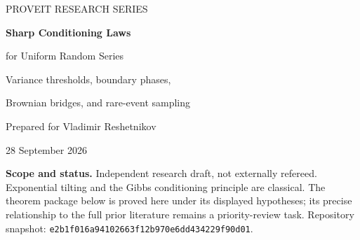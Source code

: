 \documentclass[11pt,a4paper]{article}
\numberwithin{equation}{section}
\theoremstyle{definition}
\theoremstyle{remark}
\begin{document}
\hypersetup{pageanchor=false}
\begin{titlepage}
\vspace*{8mm}
{\large\sffamily\color{ink} PROVEIT RESEARCH SERIES\par}
\vspace{12mm}
{\Huge\bfseries Sharp Conditioning Laws\par
 for Uniform Random Series\par}
\vspace{7mm}
{\Large Variance thresholds, boundary phases,\par
 Brownian bridges, and rare-event sampling\par}
\vspace{10mm}
{\normalsize Prepared for Vladimir Reshetnikov\par
 28 September 2026\par}
\vspace{12mm}
\begin{abstract}
Let $S=\sum_{k\ge1}w_kU_k$, where the $U_k$ are independent uniform
random variables and the positive weights are summable. What does an
entire configuration look like when $S$ is forced close to zero? We prove
a conditional-law theorem for the moving exponential tilt of this series.
For every positive summable weight sequence, a coordinate block is
asymptotically unaffected by the conditioning in total variation if and
only if it carries a vanishing fraction of the tilted variance. No
monotonicity or regular spacing of the weights is required. For a
limiting variance fraction $\alpha\in(0,1)$, we calculate the exact
nonzero total-variation profile and the relative-entropy limit
$[-\log(1-\alpha)-\alpha]/2$. At fraction one, total variation tends to
one and relative entropy diverges.

For geometric weights, including the classical Fabius distribution,
we identify an infinite, phase-dependent boundary product law, prove a
Brownian-bridge limit for conditioned partial sums, and show that the
rescaled gap to the conditioning boundary becomes an independent
exponential random variable. The same variance criterion applies to
stretched-exponential and polynomial weights. A lazy rejection sampler
is exact in a real-arithmetic model and uses asymptotically
$\sqrt{2\pi}\,n^{3/2}$ scalar uniform draws per accepted geometric
configuration, where $n$ is the effective dimension.

The proofs are given in full. Exact finite-simplex formulas and
reproducible numerical experiments check the constants, but are not
used as substitutes for proofs. The contribution is a conditional
configuration theory connected to the repository's scalar Fabius
endpoint program; neither global priority nor Lean verification is
asserted.
\end{abstract}
\vfill
\noindent\small
\textbf{Scope and status.} Independent research draft, not externally
refereed. Exponential tilting and the Gibbs conditioning principle are
classical. The theorem package below is proved here under its displayed
hypotheses; its precise relationship to the full prior literature remains
a priority-review task. Repository snapshot:
\texttt{e2b1f016a94102663f12b970e6dd434229f90d01}.
\end{titlepage}
\end{document}
